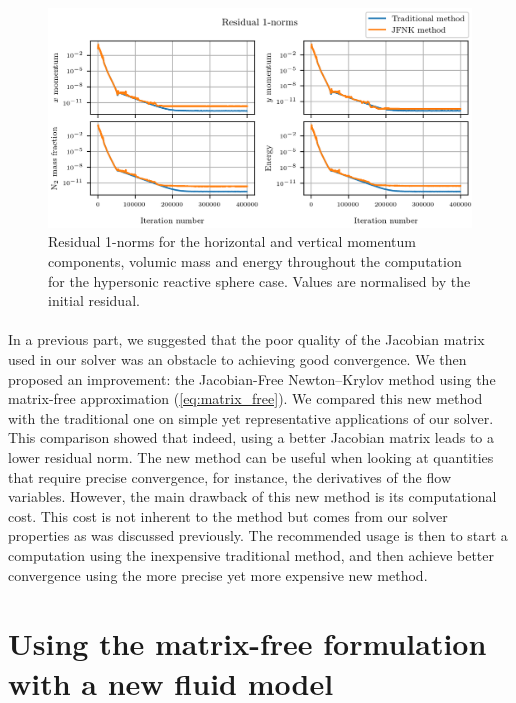         \begin{figure}
          \centering
          \includegraphics{figures/sphere_reac_residuals.png}
          \caption{Residual 1-norms for the horizontal and vertical momentum components,  volumic mass and energy throughout the computation for the hypersonic reactive sphere case.
          Values are normalised by the initial residual.}
          \label{fig:sphere_reac_residuals}
        \end{figure}

    \paragraph{}
    In a previous part, we suggested that the poor quality of the Jacobian matrix used in our solver was an obstacle to achieving good convergence.
    We then proposed an improvement: the Jacobian-Free Newton--Krylov method using the matrix-free approximation (\ref{eq:matrix_free}).
    We compared this new method with the traditional one on simple yet representative applications of our solver.
    This comparison showed that indeed, using a better Jacobian matrix leads to a lower residual norm.
    The new method can be useful when looking at quantities that require precise convergence, for instance, the derivatives of the flow variables.
    However, the main drawback of this new method is its computational cost.
    This cost is not inherent to the method but comes from our solver properties as was discussed previously.
    The recommended usage is then to start a computation using the inexpensive traditional method, and then achieve better convergence using the more precise yet more expensive new method.


  \section{Using the matrix-free formulation with a new fluid model}

